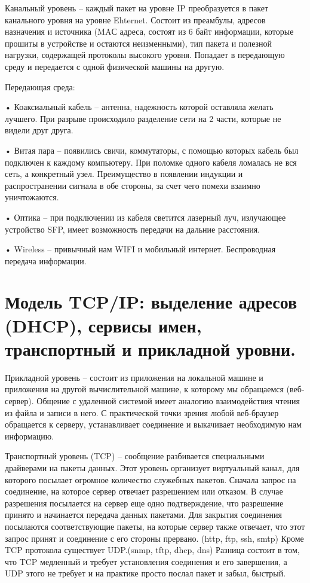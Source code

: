 \documentclass{article}
\begin{document}
Канальный уровень – каждый пакет на уровне IP преобразуется в пакет канального уровня на уровне Ehternet. 
Состоит из преамбулы, адресов назначения и источника (MAС адреса, состоят из 6 байт информации, которые прошиты в устройстве и остаются неизменными), 
тип пакета и полезной нагрузки, содержащей протоколы высокого уровня. 
Попадает в передающую среду и передается с одной физической машины на другую. 

Передающая среда:

•	Коаксиальный кабель – антенна, надежность которой оставляла желать лучшего. При разрыве происходило разделение сети на 2 части, которые не видели друг друга.

•	Витая пара – появились свичи, коммутаторы, с помощью которых кабель был подключен к каждому компьютеру. При поломке одного кабеля ломалась не вся сеть, а конкретный узел. 
Преимущество в появлении индукции и распространении сигнала в обе стороны, за счет чего помехи взаимно уничтожаются.  

•	Оптика – при подключении из кабеля светится лазерный луч, излучающее устройство SFP, имеет возможность передачи на дальние расстояния. 

•	Wireless – привычный нам WIFI и мобильный интернет. Беспроводная передача информации. 


\section{Модель TCP/IP: выделение адресов (DHCP), сервисы имен, транспортный и прикладной уровни.}
Прикладной уровень – состоит из приложения на локальной машине и приложения на другой вычислительной машине, к которому мы обращаемся (веб-сервер). 
Общение с удаленной системой имеет аналогию взаимодействия чтения из файла и записи в него. 
С практической точки зрения любой веб-браузер обращается к серверу, устанавливает соединение и выкачивает необходимую нам информацию.


Транспортный уровень (TCP) – сообщение разбивается специальными драйверами на пакеты данных. 
Этот уровень организует виртуальный канал, для которого посылает огромное количество служебных пакетов. 
Сначала запрос на соединение, на которое сервер отвечает разрешением или отказом. 
В случае разрешения посылается на сервер еще одно подтверждение, что разрешение принято и начинается передача данных пакетами.
Для закрытия соединения посылаются соответствующие пакеты, на которые сервер также отвечает, что этот запрос принят и соединение с его стороны прервано. (http, ftp, ssh, smtp)
Кроме TCP протокола существует UDP.(snmp, tftp, dhcp, dns) Разница состоит в том, что TCP медленный и требует установления соединения и его завершения, а UDP этого не требует и на практике просто послал пакет и забыл, быстрый.
\end{document}
